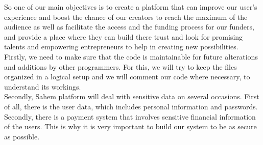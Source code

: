 So one of our main objectives is to create a platform that can improve our user's experience and boost the chance of our creators to reach the maximum of the audience as well as facilitate the access and the funding process for our funders, and provide a place where they can build there trust and look for promising talents and empowering entrepreneurs to help in creating new possibilities.\\

Firstly, we need to make sure
that the code is maintainable for future alterations and additions by other programmers. For this, we will try
to keep the files organized in a logical setup and we will comment our code where necessary, to understand
its workings.\\

Secondly, Sahem platform will deal with sensitive data on several occasions. First of all, there
is the user data, which includes personal information and passwords. Secondly, there is a payment system
that involves sensitive financial information of the users. This is why it is very important to build our system
to be as secure as possible.\\

